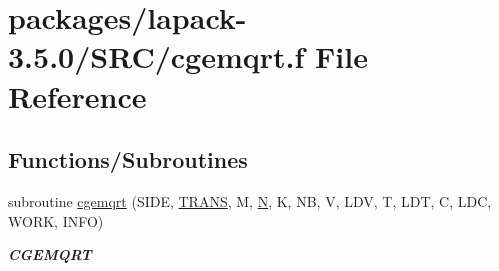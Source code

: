 \hypertarget{cgemqrt_8f}{}\section{packages/lapack-\/3.5.0/\+S\+R\+C/cgemqrt.f File Reference}
\label{cgemqrt_8f}
\subsection*{Functions/\+Subroutines}
\begin{DoxyCompactItemize}
\item 
subroutine \hyperlink{group__complexGEcomputational_ga2f7b64261525b754c678b722eb0e8785}{cgemqrt} (S\+I\+D\+E, \hyperlink{superlu__enum__consts_8h_a0c4e17b2d5cea33f9991ccc6a6678d62a1f61e3015bfe0f0c2c3fda4c5a0cdf58}{T\+R\+A\+N\+S}, M, \hyperlink{polmisc_8c_a0240ac851181b84ac374872dc5434ee4}{N}, K, N\+B, V, L\+D\+V, T, L\+D\+T, C, L\+D\+C, W\+O\+R\+K, I\+N\+F\+O)
\begin{DoxyCompactList}\small\item\em {\bfseries C\+G\+E\+M\+Q\+R\+T} \end{DoxyCompactList}\end{DoxyCompactItemize}
